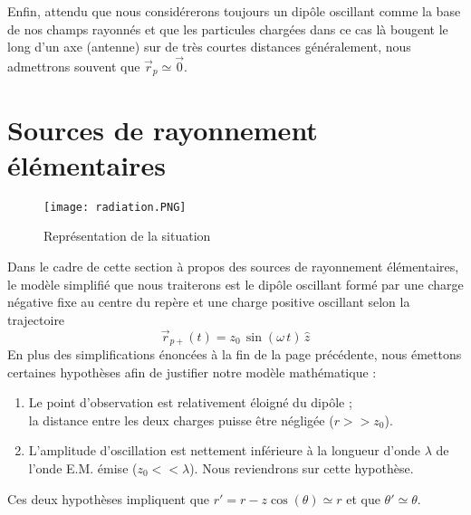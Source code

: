 Enfin, attendu que nous considérerons toujours un dipôle oscillant comme la base de nos champs rayonnés et que les particules chargées dans ce cas là bougent le long d'un axe (antenne) sur de très courtes distances généralement, nous admettrons souvent que $\vec{r}_{p} \simeq \vec{0}$.

\section{Sources de rayonnement élémentaires}
\begin{figure}[h]\centering
\texttt{[image: radiation.PNG]}
\caption{Représentation de la situation}
\label{fig:dipo}
\end{figure}
Dans le cadre de cette section à propos des sources de rayonnement élémentaires, le modèle simplifié que nous traiterons est le dipôle oscillant formé par une charge négative fixe au centre du repère et une charge positive oscillant selon la trajectoire $$ \vec{r}_{p+}(t) = z_{0}\,\sin (\omega\, t) \,\hat{z}$$ 
En plus des simplifications énoncées à la fin de la page précédente, nous émettons certaines hypothèses afin de justifier notre modèle mathématique :
\begin{enumerate}
\item Le point d'observation est relativement éloigné du dipôle ; \\la distance entre les deux charges puisse être négligée ($r>>z_0$). 
\item L'amplitude d'oscillation est nettement inférieure à la longueur d'onde $\lambda$ de l'onde E.M. émise ($z_0 <<\lambda$). Nous reviendrons sur cette hypothèse.
\end{enumerate}
Ces deux hypothèses impliquent que $r'=r-z\cos(\theta)\simeq r$ et que $\theta'\simeq \theta$.

